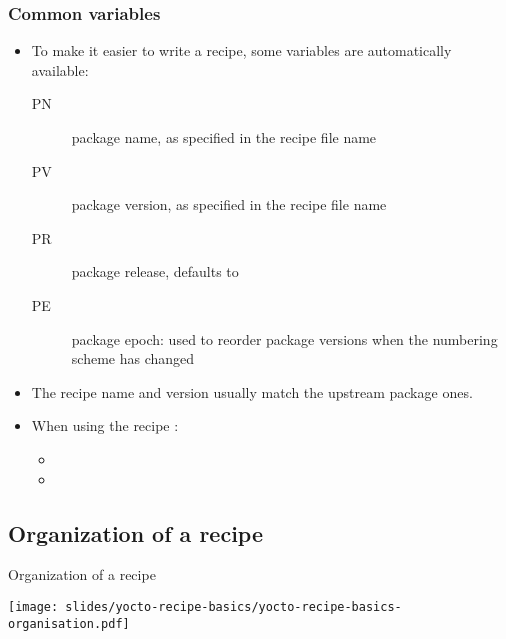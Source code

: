 \begin{frame}
  \frametitle{Common variables}
  \begin{itemize}
    \item To make it easier to write a recipe, some variables are
      automatically available:
      \begin{description}
        \item[PN] package name, as specified in the recipe file name
        \item[PV] package version, as specified in the recipe file
          name
        \item[PR] package release, defaults to 
        \item[PE] package epoch: used to reorder package versions when
          the numbering scheme has changed
      \end{description}
    \item The recipe name and version usually match the upstream
      package ones.
    \item When using the recipe :
      \begin{itemize}
        \item {}
        \item {}
      \end{itemize}
  \end{itemize}
\end{frame}

\subsection{Organization of a recipe}

\begin{frame}{Organization of a recipe}
  \begin{center}
    \texttt{[image: slides/yocto-recipe-basics/yocto-recipe-basics-organisation.pdf]}
  \end{center}
\end{frame}

